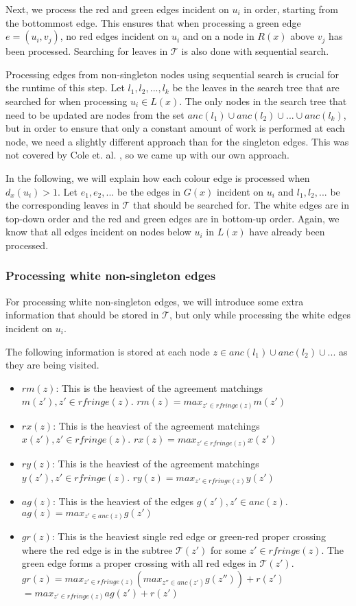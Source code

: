 Next, we process the red and green edges incident on $u_i$ in order, starting from the bottommost edge. This ensures that when processing a green edge $e=(u_i,v_j)$, no red edges incident on $u_i$ and on a node in $R(x)$ above $v_j$ has been processed. Searching for leaves in $\mathcal{T}$ is also done with sequential search.

Processing edges from non-singleton nodes using sequential search is crucial for the runtime of this step. Let ${l_1, l_2, ..., l_k}$ be the leaves in the search tree that are searched for when processing $u_i \in L(x)$. The only nodes in the search tree that need to be updated are nodes from the set ${anc(l_1) \cup anc(l_2) \cup ... \cup anc(l_k)}$, but in order to ensure that only a constant amount of work is performed at each node, we need a slightly different approach than for the singleton edges. This was not covered by Cole et. al. \cite{nlogn}, so we came up with our own approach.

In the following, we will explain how each colour edge is processed when $d_x(u_i) > 1$. Let $e_1, e_2, ...$ be the edges in $G(x)$ incident on $u_i$ and $l_1, l_2, ...$ be the corresponding leaves in $\mathcal{T}$ that should be searched for. The white edges are in top-down order and the red and green edges are in bottom-up order. Again, we know that all edges incident on nodes below $u_i$ in $L(x)$ have already been processed.

\subsubsection{Processing white non-singleton edges}
For processing white non-singleton edges, we will introduce some extra information that should be stored in $\mathcal{T}$, but only while processing the white edges incident on $u_i$.

The following information is stored at each node $z \in {anc(l_1) \cup anc(l_2) \cup ... }$ as they are being visited.

\begin{itemize}
	\item $rm(z)$: This is the heaviest of the agreement matchings $m(z'), z' \in rfringe(z)$.
		\subitem $rm(z) = max_{z'\in rfringe(z)} m(z')$
	\item $rx(z)$: This is the heaviest of the agreement matchings $x(z'), z' \in rfringe(z)$.
		\subitem $rx(z) = max_{z'\in rfringe(z)} x(z')$
	\item $ry(z)$: This is the heaviest of the agreement matchings $y(z'), z' \in rfringe(z)$.
		\subitem $ry(z) = max_{z'\in rfringe(z)} y(z')$
	\item $ag(z)$: This is the heaviest of the edges $g(z'), z' \in anc(z)$.
		\subitem $ag(z) = max_{z'\in anc(z)} g(z')$
	\item $gr(z)$: This is the heaviest single red edge or green-red proper crossing where the red edge is in the subtree $\mathcal{T}(z')$ for some $z' \in rfringe(z)$. The green edge forms a proper crossing with all red edges in $\mathcal{T}(z')$.
		\subitem $gr(z) = max_{z'\in rfringe(z)} (max_{z''\in anc(z')} g(z'')) + r(z')$
			\subsubitem $ = max_{z'\in rfringe(z)} ag(z') + r(z')$
\end{itemize}

